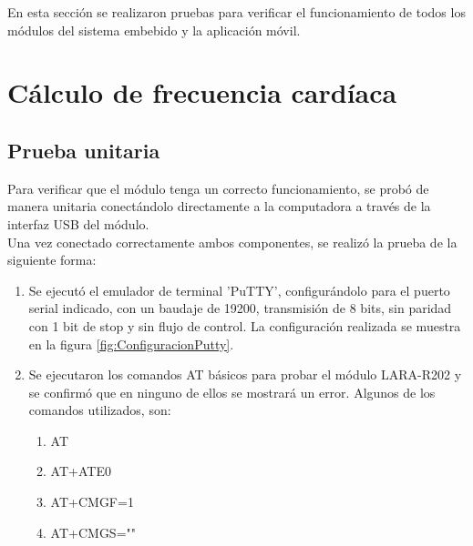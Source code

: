 En esta sección se realizaron pruebas para verificar el funcionamiento de todos los módulos del sistema embebido y la aplicación móvil.

\section{Cálculo de frecuencia cardíaca}

\subsection{Prueba unitaria}
Para verificar que el módulo tenga un correcto funcionamiento, se probó de manera unitaria conectándolo directamente a la computadora a través de la interfaz USB del módulo.\\ %
%
	
Una vez conectado correctamente ambos componentes, se realizó la prueba de la siguiente forma:
\begin{enumerate}
	\item Se ejecutó el emulador de terminal ’PuTTY’, configurándolo para el puerto serial
	indicado, con un baudaje de 19200, transmisión de 8 bits, sin paridad con 1 bit de
	stop y sin flujo de control. La configuración realizada se muestra en la figura \ref{fig:ConfiguracionPutty}.
	\item Se ejecutaron los comandos AT básicos para probar el módulo LARA-R202 y se confirmó que en ninguno de ellos se mostrará un error. Algunos de los comandos utilizados, son:

		\begin{enumerate}
			\item AT
			\item AT+ATE0
			\item AT+CMGF=1
			\item AT+CMGS=""
		\end{enumerate}	
\end{enumerate}
 

